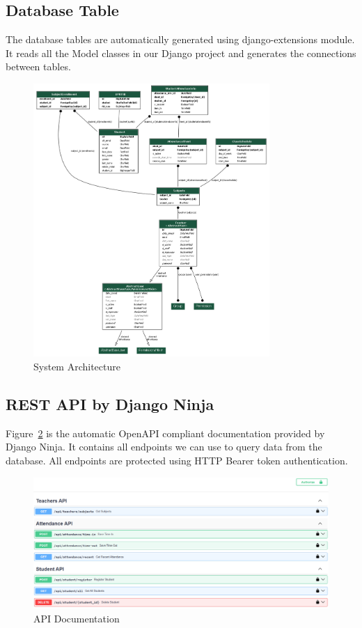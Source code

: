\subsection{Database Table}
The database tables are automatically generated using django-extensions module. It reads all the Model classes in our Django project and generates the connections between tables.
\begin{figure}[h] %
	\centering
	\includegraphics[width=0.8\textwidth]{figures/chapter4/db_tables.png} %
	\caption{System Architecture}
	\label{fig:db_tables}
\end{figure}	

\subsection{REST API by Django Ninja}
Figure~\ref{fig:api} is the automatic OpenAPI compliant documentation provided by Django Ninja. It contains all endpoints we can use to query data from the database. All endpoints are protected using HTTP Bearer token authentication.
\begin{figure}[h] %
	\centering
	\includegraphics[width=1\textwidth]{figures/chapter4/api.png} %
	\caption{API Documentation}
	\label{fig:api}
\end{figure}

